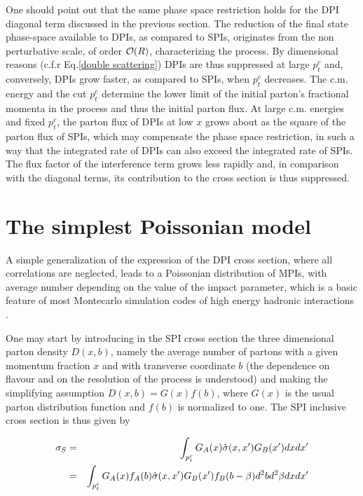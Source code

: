\documentclass{ws-rv9x6}
\begin{document}
One should point out that the same phase space restriction holds for the DPI diagonal term discussed in the previous section\cite{Diehl:2011yj, Markus+Jo}. The reduction of the final state phase-space available to DPIs, as compared to SPIs, originates from the non perturbative scale, of order ${\cal O}(R)$, characterizing the process. By dimensional reasons (c.f.r Eq.\ref{double scattering}) DPIs are thus suppressed at large $p_t^c$ and, conversely, DPIs grow faster, as compared to SPIs, when $p_t^c$ decreases. The c.m. energy and the cut $p_t^c$ determine the lower limit of the initial parton's fractional momenta in the process and thus the initial parton flux. At large c.m. energies and fixed $p_t^c$, the parton flux of DPIs at low $x$ grows about as the square of the parton flux of SPIs, which may compensate the phase space restriction, in such a way that the integrated rate of DPIs can also exceed the integrated rate of SPIs. The flux factor of the interference term grows less rapidly and, in comparison with the diagonal terms, its contribution to the cross section is thus suppressed. 

\section{The simplest Poissonian model}

A simple generalization of the expression of the DPI cross section, where all correlations are neglected, leads to a Poissonian distribution of
MPIs, with  average number depending on the
value of the impact parameter\cite{Ametller:1987ru}, which is a basic feature of most Montecarlo simulation codes of high energy hadronic interactions \cite{Sjostrand:1987su, Butterworth:1996zw, Bahr:2008dy}. 

One may start by 
introducing in the SPI cross section the three dimensional parton density $D(x,b)$, namely
the average number of partons with a given momentum fraction $x$
and with transverse coordinate $b$ (the dependence on flavour and
on the resolution of the process is understood) and making the
simplifying assumption $D(x,b)=G(x)f(b)$, where $G(x)$ is the usual
parton distribution function and $f(b)$ is normalized to one. The SPI
inclusive cross section is thus given by

\begin{eqnarray}
\sigma_S&=&\int_{p_t^c} G_A(x)\hat{\sigma}(x,x')G_B(x') dxdx'\cr
&=&\int_{p_t^c} G_A(x)f_A(b) \hat{\sigma}(x,x')G_B(x')f_B(b-\beta)
         d^2 bd^2\beta dxdx'
\end{eqnarray}
\end{document}
